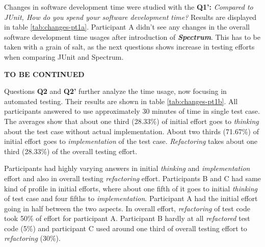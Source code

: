 Changes in software development time were studied with the \textbf{Q1':} \textit{Compared to JUnit, How do you spend your
software development time?} Results are displayed in table \ref{tab:changes-pt1a}. Participant A
didn't see any changes in the overall software development time usages after introduction of \textbf{\textit{Spectrum}}. This has to be taken
with a grain of salt, as the  next questions shows increase in testing efforts when comparing JUnit and Spectrum.

\textbf{TO BE CONTINUED}

Questions \textbf{Q2} and \textbf{Q2'} further analyze the time usage, now focusing in automated testing. Their results are
shown in table \ref{tab:changes-pt1b}. All participants answered to use approximately 30 minutes of time in single test case. The
averages show that about one third (28.33\%) of initial effort goes to \textit{thinking} about the test case without actual implementation.
About two thirds (71.67\%) of initial effort goes to \textit{implementation} of the test case. \textit{Refactoring} takes about one third (28.33\%)
of the overall testing effort.

Participants had highly varying answers in initial \textit{thinking} and \textit{implementation} effort and also
in overall testing \textit{refactoring} effort. Participants B and C had same kind of profile
in initial efforts, where about one fifth of it goes to initial \textit{thinking} of test case and four fifths to \textit{implementation}.
Participant A had the initial effort going in half between the two aspects. In overall effort,
\textit{refactoring} of test code took 50\% of effort for participant A. Participant B
hardly at all \textit{refactored} test code (5\%) and participant C used around one third of overall testing effort
to \textit{refactoring} (30\%).


